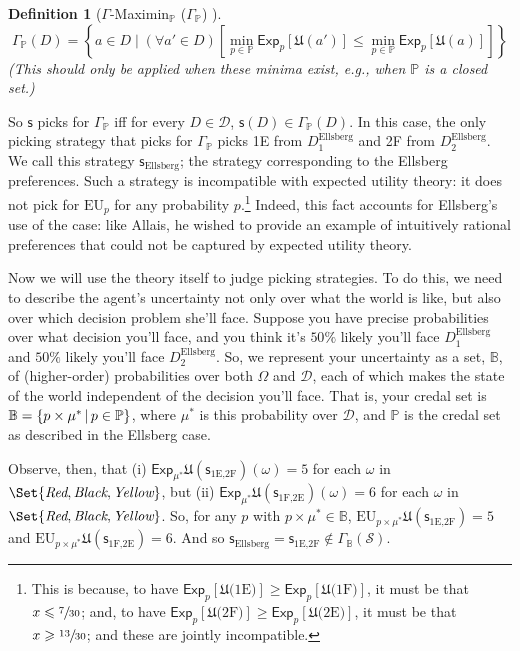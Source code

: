 \documentclass[a4paper]{article}
\newtheorem{definition}{Definition}
\renewcommand\P{\mathbb{P}} %
\newcommand\Exp{\mathsf{Exp}}
\newcommand\EU{\mathrm{EU}}
\newcommand\U{\mathfrak{U}} %
\newcommand\Maximin{\Gamma}
\newcommand{\D}{\mathcal{D}}
\renewcommand\S{\mathcal{S}}
\newcommand\s{\mathsf{s}}
\newcommand{\IB}{\mathbb{B}}
\newcommand{\IP}{\P}
\newcommand\SetDelimiter[1][]{
	\nonscript\,#1\vert \allowbreak \nonscript\,\mathopen{}}
\providecommand\given{\SetDelimiter}
\renewcommand{\leq}{\leqslant}
\renewcommand{\geq}{\geqslant}
\newenvironment{CCM rewritten}
{\begingroup\color{blue}} %
{\endgroup}              %
\begin{document}
\begin{definition}[$\Gamma$-Maximin$_\IP$ ($\Maximin_\IP$) ]
$$
\Maximin_\IP(D) = \left \{ a \in D \mid (\forall a' \in D)\left [\min_{p \in \IP} \Exp_p[\U(a')] \leq \min_{p \in \IP} \Exp_p[\U(a)] \right ] \right \}
$$
(This should only be applied when these minima exist, e.g., when $\IP$ is a closed set.)
\end{definition}

So $\s$ picks for $\Maximin_\IP$ iff for every $D\in\D$, $\s(D)\in\Maximin_\IP(D)$. In this case, the only picking strategy that picks for $\Maximin_\IP$ picks 1E from $D^{\mathrm{Ellsberg}}_1$ and 2F from $D^{\mathrm{Ellsberg}}_2$. We call this strategy $\s_{\mathrm{Ellsberg}}$; the strategy corresponding to the Ellsberg preferences. Such a strategy is incompatible with expected utility theory: it does not pick for $\EU_p$ for any probability $p$.\footnote{\label{ftnte:Ellsberg not EU}This is because, to have $\Exp_p[\U(\text{1E)}]\geq \Exp_p[\U(\text{1F)}]$, it must be that $x\leq \sfrac{7}{30}$; and, to have  $\Exp_p[\U(\text{2F)}]\geq \Exp_p[\U(\text{2E)}]$, it must be that $x\geq \sfrac{13}{30}$; and these are jointly incompatible. } Indeed, this fact accounts for Ellsberg's use of the case: like Allais, he wished to provide an example of intuitively rational preferences that could not be captured by expected utility theory. 

Now we will use the theory itself to judge picking strategies. To do this, we need to describe the agent's uncertainty not only over what the world is like, but also over which decision problem she'll face. 
Suppose you have precise probabilities over what decision you'll face, and you think it's $50\%$ likely you'll face $D^{\mathrm{Ellsberg}}_1$ and $50\%$ likely you'll face $D^{\mathrm{Ellsberg}}_2$. 
So, we represent your uncertainty as a set, $\IB$, of (higher-order) probabilities over both $\Omega$ and $\D$, each of which makes the state of the world independent of the decision you'll face. 
{That is, your credal set is $\IB=\{p\times\mu^* \given p\in\IP\}$, where $\mu^*$ is this probability over $\D$, and $\IP$ is the credal set as described in the Ellsberg case.}

Observe, then, that (i) $\Exp_{\mu^*}\U(\s_{\text{1E,2F}})(\omega)=5$ for each $\omega$ in $\Set{\emph{Red}, \emph{Black}, \emph{Yellow}}$, but (ii) $\Exp_{\mu^*}\U(\s_{\text{1F,2E}})(\omega)=6$ for each $\omega$ in $\Set{\emph{Red}, \emph{Black}, \emph{Yellow}}$. So, for any $p$ with $p\times \mu^*\in \IB$,  $\EU_{p\times\mu^*}\U(\s_{\text{1E,2F}})=5$ and  $\EU_{p\times\mu^*}\U(\s_{\text{1F,2E}})=6$. And so $\s_{\mathrm{Ellsberg}}=\s_{\text{1E,2F}}\notin\Maximin_{\IB}(\S)$. 
\end{document}
